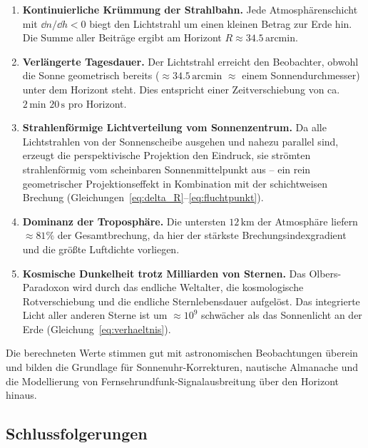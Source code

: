 \documentclass[12pt,a4paper]{article}
\providecommand{\SI}[2]{\ensuremath{#1\,#2}}
\providecommand{\ang}[1]{\ensuremath{#1\,\mathrm{arcmin}}}
\providecommand{\kilo}{\mathrm{k}}
\providecommand{\metre}{\mathrm{m}}
\providecommand{\second}{\mathrm{s}}
\providecommand{\minute}{\mathrm{min}}
\begin{document}
\begin{enumerate}
  \item \textbf{Kontinuierliche Krümmung der Strahlbahn.}
        Jede Atmosphärenschicht mit $\dd n/\dd h < 0$ biegt den
        Lichtstrahl um einen kleinen Betrag zur Erde hin.
        Die Summe aller Beiträge ergibt am Horizont
        $R \approx \ang{34.5}$.

  \item \textbf{Verlängerte Tagesdauer.}
        Der Lichtstrahl erreicht den Beobachter,
        obwohl die Sonne geometrisch bereits ($\approx \ang{34.5}$
        $\approx$ einem Sonnendurchmesser) unter dem Horizont steht.
        Dies entspricht einer Zeitverschiebung von ca.\ \SI{2}{\minute}
        \SI{20}{\second} pro Horizont.

  \item \textbf{Strahlenförmige Lichtverteilung vom Sonnenzentrum.}
        Da alle Lichtstrahlen von der Sonnenscheibe ausgehen
        und nahezu parallel sind, erzeugt die perspektivische
        Projektion den Eindruck, sie strömten strahlenförmig
        vom scheinbaren Sonnenmittelpunkt aus --
        ein rein geometrischer Projektionseffekt in Kombination
        mit der schichtweisen Brechung
        (Gleichungen~\ref{eq:delta_R}--\ref{eq:fluchtpunkt}).

  \item \textbf{Dominanz der Troposphäre.}
        Die untersten $\SI{12}{\kilo\metre}$ der Atmosphäre
        liefern $\approx 81\%$ der Gesamtbrechung,
        da hier der stärkste Brechungsindexgradient und die
        größte Luftdichte vorliegen.

  \item \textbf{Kosmische Dunkelheit trotz Milliarden von Sternen.}
        Das Olbers-Paradoxon wird durch das endliche Weltalter,
        die kosmologische Rotverschiebung und die endliche
        Sternlebensdauer aufgelöst.
        Das integrierte Licht aller anderen Sterne ist um
        $\approx 10^9$ schwächer als das Sonnenlicht an der Erde
        (Gleichung~\ref{eq:verhaeltnis}).
\end{enumerate}

Die berechneten Werte stimmen gut mit astronomischen Beobachtungen überein
\citep{Stone1996} und bilden die Grundlage für
Sonnenuhr-Korrekturen, nautische Almanache und die Modellierung
von Fernsehrundfunk-Signalausbreitung über den Horizont hinaus.

\subsection{Schlussfolgerungen}
\end{document}

